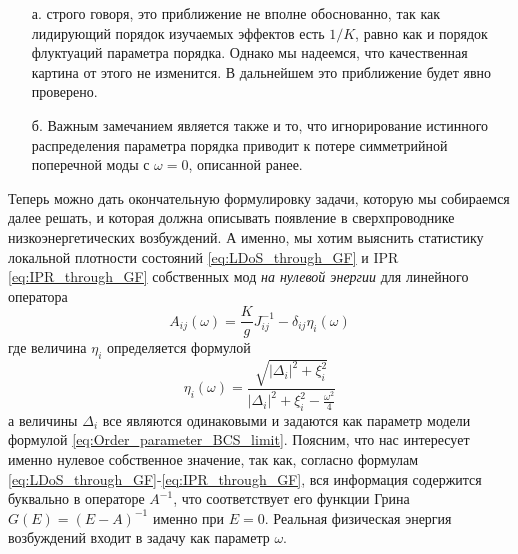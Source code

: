 \begin{enumerate}
	\begin{enumerate}
		\item[а.] строго говоря, это приближение не вполне обоснованно, так как лидирующий порядок изучаемых эффектов есть $1/K$, равно как и порядок флуктуаций параметра порядка. Однако мы надеемся, что качественная картина от этого не изменится. В дальнейшем это приближение будет явно проверено.
		\item[б.] Важным замечанием является также и то, что игнорирование истинного распределения параметра порядка приводит к потере симметрийной поперечной моды с $\omega = 0$, описанной ранее.
	\end{enumerate}
\end{enumerate}

Теперь можно дать окончательную формулировку задачи, которую мы собираемся далее решать, и которая должна описывать появление в сверхпроводнике низкоэнергетических возбуждений. А именно, мы хотим выяснить статистику локальной плотности состояний \eqref{eq:LDoS_through_GF} и IPR \eqref{eq:IPR_through_GF} собственных мод \textit{на нулевой энергии} для линейного оператора 
\begin{equation}
	\label{eq:Investigated_linear_operator}
	A_{ij}(\omega) = \frac{K}{g} J_{ij}^{-1} - \delta_{ij} \eta_i (\omega)
\end{equation}
где величина $\eta_i$ определяется формулой
\begin{equation}
	\label{eq:eta_definition}
	\eta_i(\omega) = \frac{ \sqrt{ |\Delta_i|^2 + \xi_i^2 } }{ |\Delta_i|^2 + \xi_i^2 - \frac{\omega^2}{4} }
\end{equation}
а величины $\Delta_i$ все являются одинаковыми и задаются как параметр модели формулой \eqref{eq:Order_parameter_BCS_limit}. Поясним, что нас интересует именно нулевое собственное значение, так как, согласно формулам \eqref{eq:LDoS_through_GF}-\eqref{eq:IPR_through_GF}, вся информация содержится буквально в операторе $A^{-1}$, что соответствует его функции Грина $G(E) = (E - A)^{-1}$ именно при $E = 0$. Реальная физическая энергия возбуждений входит в задачу как параметр $\omega$.


